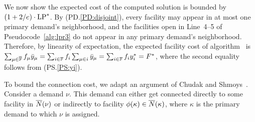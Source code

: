 
\medskip
We now show the expected cost of the computed solution is bounded by
$(1+2/e) \cdot \mbox{\rm LP}^\ast$. By
(PD.\ref{PD:disjoint}), every facility may appear in at
most one primary demand's neighborhood, and the facilities
open in Line~4--5 of Pseudocode~\ref{alg:lpr3} do not appear
in any primary demand's neighborhood. Therefore, by
linearity of expectation, the expected facility cost of
algorithm~{\ECHS} is $\sum_{\mu\in\overline{\mathbb{F}}}
f_\mu {\bar y}_{\mu} = \sum_{i\in\mathbb{F}} f_i\sum_{\mu\in i}
{\bar y}_{\mu} = \sum_{i\in\mathbb{F}} f_i y_i^\ast = F^\ast$,
where the second equality follows from (PS.\ref{PS:yi}).

To bound the connection cost, we adapt an argument of Chudak
and Shmoys~\cite{ChudakS04}. Consider a demand $\nu$. This
demand can either get connected directly to some facility in
${\overline{N}}(\nu)$ or indirectly to facility $\phi(\kappa)\in
{\overline{N}}(\kappa)$, where $\kappa$ is the primary demand to
which $\nu$ is assigned.

